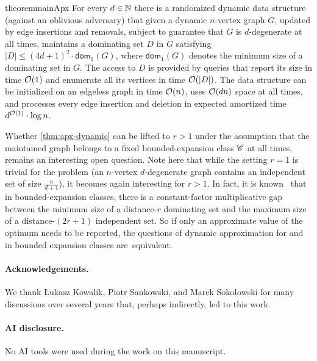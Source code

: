 \begin{restatable}{theorem}{mainApx}\label{thm:apx-dynamic}
For every $d\in \mathbb{N}$ there is a randomized dynamic data structure (against an oblivious adversary) that given a dynamic $n$-vertex graph $G$, updated by edge insertions and removals, subject to guarantee that $G$ is $d$-degenerate at all times, maintains a dominating set $D$ in $G$ satisfying $|D|\leq (4d+1)^2\cdot \mathsf{dom}_1(G)$, where $\mathsf{dom}_1(G)$ denotes the minimum size of a dominating set in $G$. The access to $D$ is provided by queries that report its size in time $\mathcal{O}(1)$ and enumerate all its vertices in time $\mathcal{O}(|D|)$. The data structure can be initialized on an edgeless graph in time $\mathcal{O}(n)$, uses $\mathcal{O}(dn)$ space at all times, and processes every edge insertion and deletion in expected amortized time $d^{\mathcal{O}(1)}\cdot \log n$.
\end{restatable}

Whether \cref{thm:apx-dynamic} can be lifted to $r>1$ under the assumption that the maintained graph belongs to a fixed bounded-expansion class $\mathscr C$ at all times, remains an interesting open question. Note here that while the setting $r=1$ is trivial for the  problem (an $n$-vertex $d$-degenerate graph contains an independent set of size $\frac{n}{d+1}$), it becomes again interesting for $r>1$. In fact, it is known~\cite{Dvorak13} that in bounded-expansion classes, there is a constant-factor multiplicative gap between the minimum size of a distance-$r$ dominating set and the maximum size of a distance-$(2r+1)$ independent set. So if only an approximate value of the optimum needs to be reported, the questions of dynamic approximation for  and  in bounded expansion classes are~equivalent.

\medskip

\paragraph*{Acknowledgements.} We thank \L{}ukasz Kowalik, Piotr Sankowski, and Marek Soko\l{}owski for many discussions over several years that, perhaps indirectly, led to this work.

\medskip

\paragraph*{AI disclosure.} No AI tools were used during the work on this manuscript.
